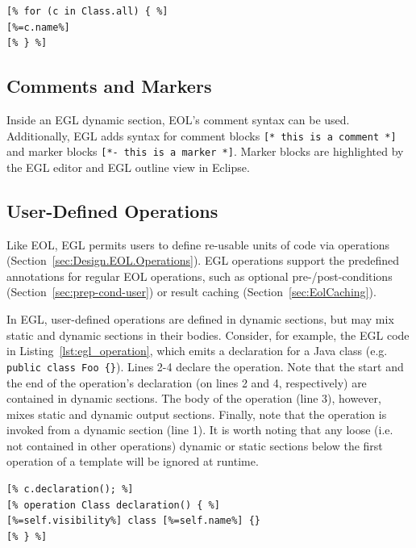 \begin{lstlisting}[float=tbp, caption=Generating the name of each Class contained in an input model., label=lst:oo, language=EGL]
[% for (c in Class.all) { %]
[%=c.name%]
[% } %]
\end{lstlisting}

\subsection{Comments and Markers}
Inside an EGL dynamic section, EOL's comment syntax can be used. Additionally, EGL adds syntax for comment blocks \texttt{[* this is a comment *]} and marker blocks \texttt{[*- this is a marker *]}. Marker blocks are highlighted by the EGL editor and EGL outline view in Eclipse.

\subsection{User-Defined Operations}

Like EOL, EGL permits users to define re-usable units of code via operations (Section~\ref{sec:Design.EOL.Operations}). EGL operations support the predefined annotations for regular EOL operations, such as optional pre-/post-conditions (Section~\ref{sec:prep-cond-user}) or
result caching (Section~\ref{sec:EolCaching}).

In EGL, user-defined operations are defined in dynamic sections, but may mix static and dynamic sections in their bodies. Consider, for example, the EGL code in Listing~\ref{lst:egl_operation}, which emits a declaration for a Java class (e.g. \texttt{public class Foo \{\}}). Lines 2-4 declare the operation. Note that the start and the end of the operation's declaration (on lines 2 and 4, respectively) are contained in dynamic sections. The body of the operation (line 3), however, mixes static and dynamic output sections. Finally, note that the operation is invoked from a dynamic section (line 1). It is worth noting that any loose (i.e. not contained in other operations) dynamic or static sections below the first operation of a template will be ignored at runtime.

\begin{lstlisting}[float=tbp, caption=Using an operation to specify the text generated for a declaration of a Java class., label=lst:egl_operation, language=EGL]
[% c.declaration(); %]
[% operation Class declaration() { %]
[%=self.visibility%] class [%=self.name%] {}
[% } %]
\end{lstlisting}

